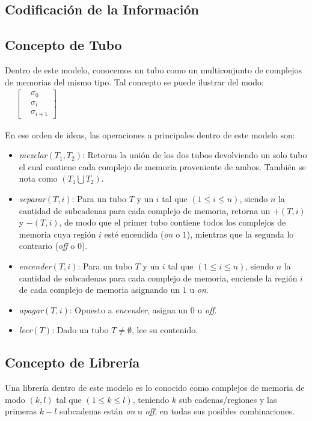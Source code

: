 \documentclass[12pt, letterpaper, twoside]{article}
\begin{document}
    \subsection{Codificación de la Información}

    \subsection{Concepto de Tubo}
    \par Dentro de este modelo, conocemos un tubo como un multiconjunto de complejos de memorias del mismo tipo. Tal concepto se puede ilustrar del modo:
        $
        \begin{aligned}
            &\begin{bmatrix}
                    & \sigma_0 \\
                    & \sigma_i \\
                    & \sigma_{i + 1} 
                \end{bmatrix}
            \end{aligned}
        $
    \par En ese orden de ideas, las operaciones a principales dentro de este modelo son:
    \begin{itemize}
        \item \emph{mezclar}$(T_1,T_2)$: Retorna la unión de los dos tubos devolviendo un solo tubo el cual contiene cada complejo de memoria proveniente de ambos. También se nota como $(T_1\bigcup T_2)$.
        \item \emph{separar}$(T, i)$: Para un tubo $T$ y un $i$ tal que $(1 \leq i \leq n)$, siendo $n$ la cantidad de subcadenas para cada complejo de memoria, retorna un $+(T, i)$ y $-(T, i)$, de modo que el primer tubo contiene todos los complejos de memoria cuya región $i$ esté encendida (\emph{on} o $1$), mientras que la segunda lo contrario (\emph{off} o $0$).
        \item \emph{encender}$(T, i)$: Para un tubo $T$ y un $i$ tal que $(1 \leq i \leq n)$, siendo $n$ la cantidad de subcadenas para cada complejo de memoria, enciende la región $i$ de cada complejo de memoria asignando un $1$ u \emph{on}.
        \item \emph{apagar}$(T, i)$: Opuesto a \emph{encender}, asigna un $0$ u \emph{off}.
        \item \emph{leer}$(T)$: Dado un tubo $T\neq\emptyset$, lee su contenido.
    \end{itemize}
    \subsection{Concepto de Librería}
    \par Una librería dentro de este modelo es lo conocido como complejos de memoria de modo $(k,l)$ tal que $(1 \leq k \leq l)$, teniendo $k$ sub cadenas/regiones y las primeras $k - l$ subcadenas están \emph{on} u \emph{off}, en todas sus posibles combinaciones.
\end{document}
